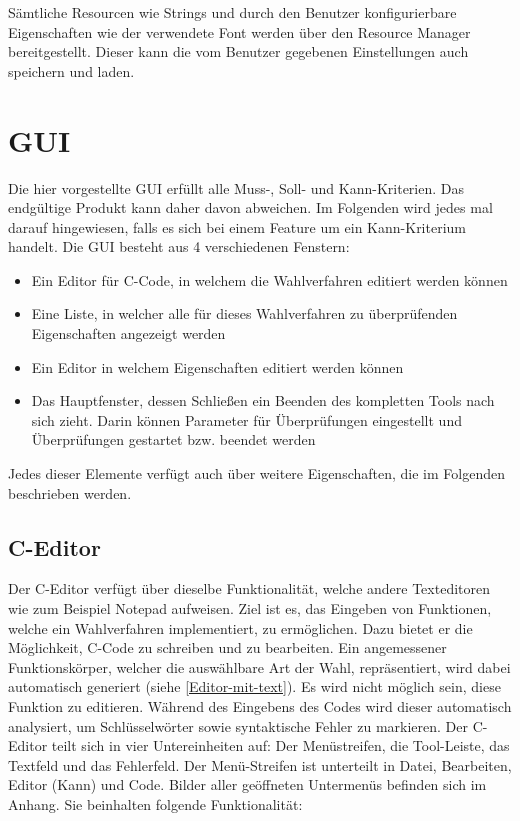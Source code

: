 \documentclass[a4paper]{scrreprt}
\begin{document}
Sämtliche Resourcen wie Strings und durch den Benutzer konfigurierbare Eigenschaften wie der verwendete Font werden über den Resource Manager bereitgestellt. Dieser kann die vom Benutzer gegebenen Einstellungen auch speichern und laden.

\chapter{GUI}
Die hier vorgestellte \ac{GUI} erfüllt alle Muss-, Soll- und Kann-Kriterien. Das endgültige Produkt kann daher davon abweichen. Im Folgenden wird jedes mal darauf hingewiesen, falls es sich bei einem Feature um ein Kann-Kriterium handelt.
Die \ac{GUI} besteht aus 4 verschiedenen Fenstern: 
\begin{itemize}
\item Ein Editor für C-Code, in welchem die Wahlverfahren editiert werden können
\item Eine Liste, in welcher alle für dieses Wahlverfahren zu überprüfenden Eigenschaften angezeigt werden
\item Ein Editor in welchem Eigenschaften editiert werden können
\item Das Hauptfenster, dessen Schließen ein Beenden des kompletten Tools nach sich zieht. Darin können Parameter für Überprüfungen eingestellt und Überprüfungen gestartet bzw. beendet werden
\end{itemize}
Jedes dieser Elemente verfügt auch über weitere Eigenschaften, die im Folgenden beschrieben werden.

\section{C-Editor}
Der C-Editor verfügt über dieselbe Funktionalität, welche andere Texteditoren wie zum Beispiel Notepad aufweisen. Ziel ist es, das Eingeben von Funktionen, welche ein Wahlverfahren implementiert, zu ermöglichen. Dazu bietet er die Möglichkeit, C-Code zu schreiben und zu bearbeiten. Ein angemessener Funktionskörper, welcher die auswählbare Art der Wahl, repräsentiert, wird dabei automatisch generiert (siehe \ref{Editor-mit-text}). Es wird nicht möglich sein, diese Funktion zu editieren. Während des Eingebens des Codes wird dieser automatisch analysiert, um Schlüsselwörter sowie syntaktische Fehler zu markieren. 
Der C-Editor teilt sich in vier Untereinheiten auf: Der Menüstreifen, die Tool-Leiste, das Textfeld und das Fehlerfeld. Der Menü-Streifen ist unterteilt in Datei, Bearbeiten, Editor (Kann) und Code. Bilder aller geöffneten Untermenüs befinden sich im Anhang. Sie beinhalten folgende Funktionalität:
\end{document}
